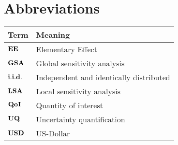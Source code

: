 

\section*{Abbreviations} %
\thispagestyle{plain} %

\phantom{This text will be invisible} 
\hspace{20cm}



\begin{table}[H]
	\centering
	\renewcommand{\arraystretch}{1.2}%
	\begin{tabular}{@{}ll@{}}
		\toprule
	Term\phantom{space}	& Meaning \\ \midrule
		$\bold{EE}$	& Elementary Effect \\
	$\bold{GSA}$	& Global sensitivity analysis \\
	$\bold{i.i.d.}$	& Independent and identically distributed  \\
	$\bold{LSA}$	& Local sensitivity analysis \\
    $\bold{QoI}$	& Quantity of interest \\
    $\bold{UQ}$	& Uncertainty quantification \\
    $\bold{USD}$	& US-Dollar  \\
 \bottomrule
	\end{tabular}
\end{table}